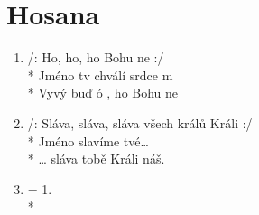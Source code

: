 \section{Hosana}
\begin{enumerate}
\item /: Ho, ho, ho Bohu  ne :/ \\*
Jméno  tv chválí  srdce m \\*
 Vyvý buď ó  , ho Bohu  ne 
\item /: Sláva, sláva, sláva všech králů Králi :/ \\*
Jméno slavíme tvé… \\*
… sláva tobě Králi náš. 
\item = 1. \\*
\end{enumerate}
